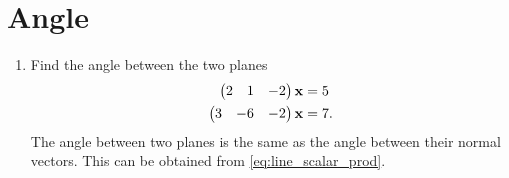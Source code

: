 \documentclass[journal,12pt,twocolumn]{IEEEtran}
\renewcommand\thesection{\arabic{section}}
\begin{document}
\section{Angle}
\renewcommand{\theequation}{\theenumi}
\begin{enumerate}[label=\thesection.\arabic*.,ref=\thesection.\theenumi]

\item Find the angle between the two planes
\label{prob:planes_angle}
\begin{align}
\begin{pmatrix}2 & 1 & -2\end{pmatrix}\mathbf{x}&=5
\\
\begin{pmatrix}3 &-6 & -2\end{pmatrix}\mathbf{x}&=7.
\end{align}
%
\solution The angle between two planes is the same as the angle between their normal vectors.  This can be obtained from \eqref{eq:line_scalar_prod}.


\end{enumerate}
\end{document}
